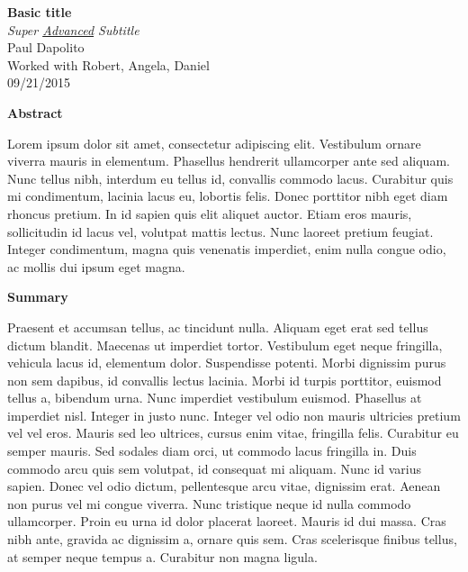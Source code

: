 \documentclass[letterpaper, boxed]{hmcpset}
\begin{document}
\begin{center}
\Large{\textbf{Basic title}} \\ 
\textit{Super \underline{Advanced} Subtitle} \\
\large{Paul Dapolito} \\
\large{Worked with Robert, Angela, Daniel} \\
\large{09/21/2015}
\end{center}
\large \begin{flushleft}
\textbf{Abstract}
\end{flushleft}
\normalsize
Lorem ipsum dolor sit amet, consectetur adipiscing elit. Vestibulum ornare viverra mauris in elementum. Phasellus hendrerit ullamcorper ante sed aliquam. Nunc tellus nibh, interdum eu tellus id, convallis commodo lacus. Curabitur quis mi condimentum, lacinia lacus eu, lobortis felis. Donec porttitor nibh eget diam rhoncus pretium. In id sapien quis elit aliquet auctor. Etiam eros mauris, sollicitudin id lacus vel, volutpat mattis lectus. Nunc laoreet pretium feugiat. Integer condimentum, magna quis venenatis imperdiet, enim nulla congue odio, ac mollis dui ipsum eget magna.\large \begin{flushleft}
\textbf{Summary}
\end{flushleft}
\normalsize
Praesent et accumsan tellus, ac tincidunt nulla. Aliquam eget erat sed tellus dictum blandit. Maecenas ut imperdiet tortor. Vestibulum eget neque fringilla, vehicula lacus id, elementum dolor. Suspendisse potenti. Morbi dignissim purus non sem dapibus, id convallis lectus lacinia. Morbi id turpis porttitor, euismod tellus a, bibendum urna. Nunc imperdiet vestibulum euismod. Phasellus at imperdiet nisl. Integer in justo nunc. Integer vel odio non mauris ultricies pretium vel vel eros. Mauris sed leo ultrices, cursus enim vitae, fringilla felis. Curabitur eu semper mauris. Sed sodales diam orci, ut commodo lacus fringilla in. Duis commodo arcu quis sem volutpat, id consequat mi aliquam.
Nunc id varius sapien. Donec vel odio dictum, pellentesque arcu vitae, dignissim erat. Aenean non purus vel mi congue viverra. Nunc tristique neque id nulla commodo ullamcorper. Proin eu urna id dolor placerat laoreet. Mauris id dui massa. Cras nibh ante, gravida ac dignissim a, ornare quis sem. Cras scelerisque finibus tellus, at semper neque tempus a. Curabitur non magna ligula.
\end{document}
